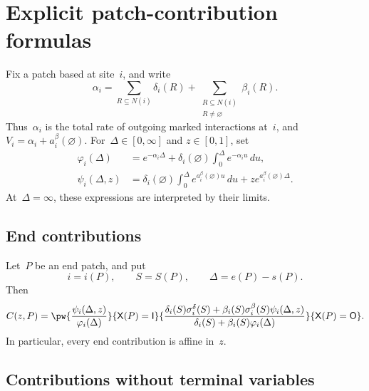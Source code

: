 \section{Explicit patch-contribution formulas}
\label{app:contribution-formulas}

Fix a patch based at site~$i$, and write
\begin{equation*}
\alpha_i
=
\sum_{R\subseteq N(i)}\delta_i(R)
+
\sum_{\substack{R\subseteq N(i)\\R\neq\varnothing}}\beta_i(R).
\end{equation*}
Thus~$\alpha_i$ is the total rate of outgoing marked interactions at~$i$, and
$V_i=\alpha_i+a_i^\beta(\varnothing)$. For~$\Delta\in[0,\infty]$ and
$z\in[0,1]$, set
\begin{align}
\varphi_i(\Delta)
&=
e^{-\alpha_i\Delta}
+
\delta_i(\varnothing)
\int_0^\Delta e^{-\alpha_i u}\,du,
\label{eq:patch-phi}
\\
\psi_i(\Delta,z)
&=
\delta_i(\varnothing)
\int_0^\Delta e^{a_i^\beta(\varnothing)u}\,du
+
z e^{a_i^\beta(\varnothing)\Delta}.
\label{eq:patch-psi}
\end{align}
At~$\Delta=\infty$, these expressions are interpreted by their limits.

\subsection{End contributions}
\label{app:end-formulas}

Let~$P$ be an end patch, and put
\begin{equation*}
i=i(P),
\qquad
S=S(P),
\qquad
\Delta=e(P)-s(P).
\end{equation*}
Then
\begin{equation}
\label{eq:end-contribution-formulas}
C(z,P)
=
\pw{
\displaystyle
\frac{\psi_i(\Delta,z)}{\varphi_i(\Delta)}
}{\mathsf X(P)=\mathsf I}
{
\displaystyle
\frac{
\delta_i(S)\sigma_i^\delta(S)
+
\beta_i(S)\sigma_i^\beta(S)\psi_i(\Delta,z)
}{
\delta_i(S)+\beta_i(S)\varphi_i(\Delta)
}
}{\mathsf X(P)=\mathsf O}.
\end{equation}
In particular, every end contribution is affine in~$z$.

\subsection{Contributions without terminal variables}
\label{app:bulk-formulas}


